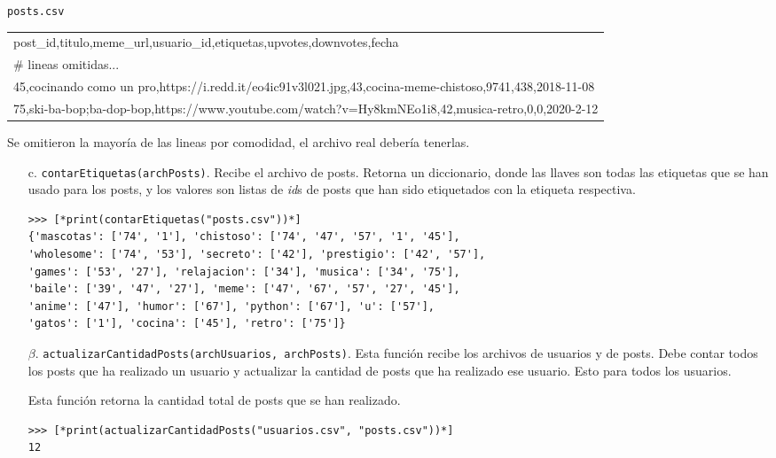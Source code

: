 \begin{center}
    \texttt{posts.csv} \\
	\begin{tabular}{|l|}
		\hline
post\_id,titulo,meme\_url,usuario\_id,etiquetas,upvotes,downvotes,fecha\\
\# lineas omitidas...\\
45,cocinando como un pro,https://i.redd.it/eo4ic91v3l021.jpg,43,cocina-meme-chistoso,9741,438,2018-11-08\\
75,ski-ba-bop;ba-dop-bop,https://www.youtube.com/watch?v=Hy8kmNEo1i8,42,musica-retro,0,0,2020-2-12\\
        \hline
	\end{tabular}

Se omitieron la mayoría de las lineas por comodidad, el archivo real debería tenerlas.

\end{center}

\begin{enumerate}

    \item[c.] \texttt{contarEtiquetas(archPosts)}. Recibe el archivo de posts. Retorna un diccionario, donde las llaves son todas las etiquetas que se han usado para los posts, y los valores son listas de \textit{id}s de posts que han sido etiquetados con la etiqueta respectiva.

    \begin{lstlisting}[style=consola]
>>> [*print(contarEtiquetas("posts.csv"))*]
{'mascotas': ['74', '1'], 'chistoso': ['74', '47', '57', '1', '45'], 
'wholesome': ['74', '53'], 'secreto': ['42'], 'prestigio': ['42', '57'], 
'games': ['53', '27'], 'relajacion': ['34'], 'musica': ['34', '75'], 
'baile': ['39', '47', '27'], 'meme': ['47', '67', '57', '27', '45'], 
'anime': ['47'], 'humor': ['67'], 'python': ['67'], 'u': ['57'], 
'gatos': ['1'], 'cocina': ['45'], 'retro': ['75']}
    \end{lstlisting}

    \item[$\beta$. ] \texttt{actualizarCantidadPosts(archUsuarios, archPosts)}. Esta función recibe los archivos de usuarios y de posts. Debe contar todos los posts que ha realizado un usuario y actualizar la cantidad de posts que ha realizado ese usuario. Esto para todos los usuarios.

    Esta función retorna la cantidad total de posts que se han realizado.
    \begin{lstlisting}[style=consola]
>>> [*print(actualizarCantidadPosts("usuarios.csv", "posts.csv"))*]
12
    \end{lstlisting}

\end{enumerate}

